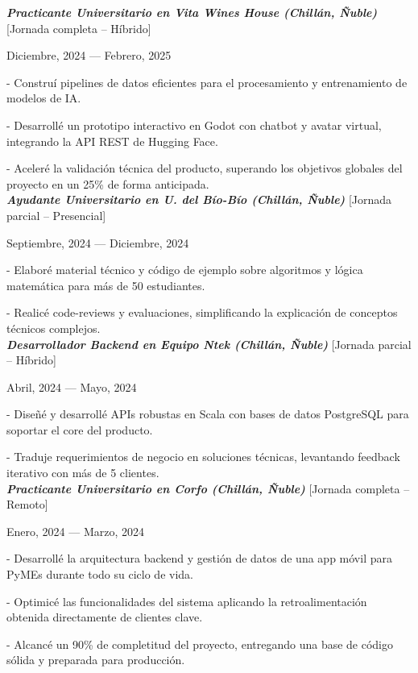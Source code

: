 \documentclass{article}
\begin{document}
	\textit{\textbf{Practicante Universitario en Vita Wines House (Chillán, Ñuble)}} [Jornada completa -- Híbrido] \par
	Diciembre, 2024 --- Febrero, 2025 \par
	- Construí pipelines de datos eficientes para el procesamiento y entrenamiento de modelos de IA. \par
	- Desarrollé un prototipo interactivo en Godot con chatbot y avatar virtual, integrando la API REST de Hugging Face. \par
	- Aceleré la validación técnica del producto, superando los objetivos globales del proyecto en un 25\% de forma anticipada. \\
	
	\textit{\textbf{Ayudante Universitario en U. del Bío-Bío (Chillán, Ñuble)}} [Jornada parcial -- Presencial] \par
	Septiembre, 2024 --- Diciembre, 2024 \par
	- Elaboré material técnico y código de ejemplo sobre algoritmos y lógica matemática para más de 50 estudiantes. \par
	- Realicé code-reviews y evaluaciones, simplificando la explicación de conceptos técnicos complejos. \\
	
	\textit{\textbf{Desarrollador Backend en Equipo Ntek (Chillán, Ñuble)}} [Jornada parcial -- Híbrido] \par
	Abril, 2024 --- Mayo, 2024 \par
	- Diseñé y desarrollé APIs robustas en Scala con bases de datos PostgreSQL para soportar el core del producto. \par
	- Traduje requerimientos de negocio en soluciones técnicas, levantando feedback iterativo con más de 5 clientes. \\
	
	\textit{\textbf{Practicante Universitario en Corfo (Chillán, Ñuble)}} [Jornada completa -- Remoto] \par
	Enero, 2024 --- Marzo, 2024 \par
	- Desarrollé la arquitectura backend y gestión de datos de una app móvil para PyMEs durante todo su ciclo de vida. \par
	- Optimicé las funcionalidades del sistema aplicando la retroalimentación obtenida directamente de clientes clave. \par
	- Alcancé un 90\% de completitud del proyecto, entregando una base de código sólida y preparada para producción. \\
	
\end{document}
